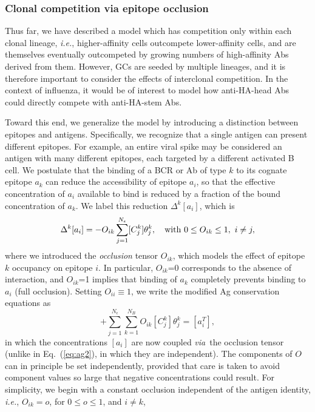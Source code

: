 \documentclass[utf8]{frontiersHLTH}%
\newcommand{\vo}[1]{#1} %
\def\ie {{\it i.e.}}
\def\via {{\it via}}
\newcommand{\eq}[1] {Eq.~(\ref{eq:#1})}
\begin{document}
\subsubsection{Clonal competition via epitope occlusion}
\label{sec:occlusion}
Thus far, we have described a model which has competition only within
each clonal lineage, \ie, higher-affinity cells outcompete
lower-affinity cells, and are themselves eventually outcompeted by
growing numbers of high-affinity Abs derived from them. However, GCs are
seeded by multiple lineages, and it is therefore important to
consider the effects of interclonal competition. In the context of influenza, it would be of interest to model
how anti-HA-head Abs could directly compete with anti-HA-stem Abs.

\vo{Toward this end}, we generalize the model by introducing a distinction
between epitopes and antigens. Specifically, we recognize that a single
antigen can present different epitopes.
For example, an entire viral spike may be considered an antigen with many
different epitopes, each targeted by a different activated B cell. We
postulate that the binding of a BCR or Ab of type $k$ to its
cognate epitope $a_k$ can reduce the accessibility of epitope
$a_i$, so that the effective concentration of $a_i$ available to bind is
reduced by a fraction of the bound concentration of $a_k$. %
We label this reduction $\Delta^k[a_i]$, which is
\begin{equation}
 \Delta^k [a_i] = -O_{ik} \sum^{N_\epsilon}_{j=1}[C^k_j]\theta^k_j, \quad {\rm with} \ 0\le O_{ik}\le1, \ i\ne j,
\end{equation}
where we introduced the \textit{occlusion} tensor $O_{ik}$, which
models the effect of epitope $k$ occupancy on epitope $i$. In particular, $O_{ik}$=0 corresponds
to the absence of interaction, and $O_{ik}$=1 implies that binding of
$a_k$ completely prevents binding to $a_i$ (full occlusion).
Setting $O_{ii}\equiv 1$, we write the modified Ag conservation equations as
\begin{equation}
 [a_i] + \sum^{N_\epsilon}_{j=1} \sum^{N_B}_{k=1} O_{ik}[C^k_j]\theta^k_j=[a^T_i],
 \label{eq:ag3}
\end{equation}
in which the concentrations $[a_i]$ are now coupled \via~the occlusion
tensor (unlike in \eq{ag2}, in which they are independent).
The components of $O$ can in principle be set independently, provided
that care is taken to avoid component values so large that negative
concentrations could result. For simplicity, we begin with a
constant occlusion independent of the antigen identity, \ie, $O_{ik}=o$, for $0\le o\le1$, and $i\ne k$,
\end{document}
